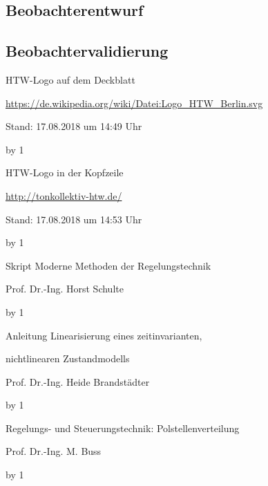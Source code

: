 \documentclass[
	pagesize,
	fontsize=12pt,
	paper=a4,
	oneside,
   reqno
]{scrartcl}
\begin{document}
\subsection{Beobachterentwurf}

\subsection{Beobachtervalidierung}

\newpage
\newcount\Quellennummer
{}

\renewcommand\refname{Literaturverzeichnis}

\begin{thebibliography}{999}
{\setlength{\emergencystretch}{3cm}%

HTW-Logo auf dem Deckblatt\par
\url{https://de.wikipedia.org/wiki/Datei:Logo_HTW_Berlin.svg} \par
 Stand: 17.08.2018 um 14:49 Uhr

\advance\Quellennummer by 1
 
HTW-Logo in der Kopfzeile\par
\url{http://tonkollektiv-htw.de/} \par
 Stand: 17.08.2018 um 14:53 Uhr

\advance\Quellennummer by 1

Skript Moderne Methoden der Regelungstechnik\par
Prof.\xspace Dr.\xspace -Ing.\xspace Horst Schulte

\advance\Quellennummer by 1

Anleitung Linearisierung eines zeitinvarianten,\par
nichtlinearen Zustandmodells\par
Prof.\xspace Dr.\xspace -Ing.\xspace Heide Brandstädter

\advance\Quellennummer by 1

Regelungs- und Steuerungstechnik: Polstellenverteilung\par
Prof.\xspace Dr.\xspace -Ing.\xspace M. Buss

\advance\Quellennummer by 1

}
\end{thebibliography}
\end{document}
